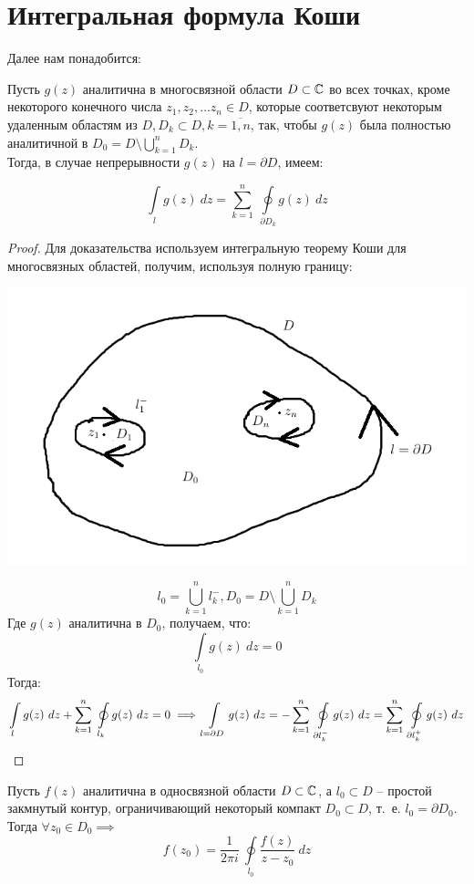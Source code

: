 \documentclass[../../main.tex]{subfiles}
\begin{document}
	\section{Интегральная формула Коши}
	Далее нам понадобится:
	\begin{lemma}
		Пусть $g(z)$ аналитична в многосвязной области $D \subset \mathbb{C}$ во всех 
		точках, кроме некоторого конечного числа $z_1, z_2, \dots z_n \in D$, 
		которые соответсвуют некоторым удаленным областям из $D, D_k \subset D, k = 
		\overline{1,n}$, так, чтобы $g(z)$ была полностью аналитичной в $D_0 = D 
		\setminus \bigcup \limits_{k=1}^{n} D_k$. \\
		Тогда, в случае непрерывности $g(z)$ на $l = \partial D$, имеем:
		
		\[\int \limits_{l} g(z) \ dz = \sum_{k=1}^{n} \ \oint \limits_{\partial D_k} 
		g(z) \ dz  \]
	\end{lemma}	
	\begin{proof}
	Для доказательства используем интегральную теорему Коши для многосвязных 
	областей, получим, используя полную границу:
	\begin{center}
		\includegraphics[width=0.7\linewidth]{lecture32_1}
	\end{center}
	\[ l_0 = \bigcup \limits_{k=1}^{n} l^{-}_{k}, D_0 = D \setminus \bigcup 
	\limits_{k=1}^{n} D_k \]
	Где $g(z)$ аналитична в $D_0$, получаем, что:
	\[ \int \limits_{l_0} g(z) \ dz = 0 \]
	Тогда:
	\[ \int \limits_{l} g(z) \ dz + \sum^{n}_{k=1} \ \oint \limits_{ l_k} g(z) \ 
	dz = 0 \implies \int \limits_{l = \partial D} g(z) \ dz = - \sum_{k=1}^{n} \ 
	\oint \limits_{\partial l_k^{-} } g(z) \ dz = \sum_{k=1}^{n} \ \oint 
	\limits_{\partial l_k^{+} } g(z) \ dz \qedhere \]
	\end{proof}	
\begin{theorem}
	Пусть $f(z)$ аналитична в односвязной области $D \subset \mathbb{C}$, а $l_0 \subset 
	D$ \--- простой закмнутый контур, ограничивающий некоторый компакт $D_0 
	\subset D$, т.~е. $l_0 = \partial D_0$. Тогда $\forall z_0\in D_0 \implies$
	\begin{equation}
	\label{32:3}
	f(z_0) = \frac{1}{2\pi i} \ \oint \limits_{l_0} \frac{f(z)}{z-z_0} \ dz
	\end{equation}
\end{theorem}
\end{document}
